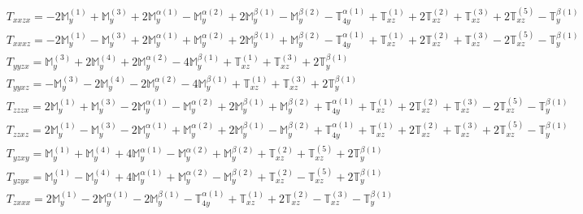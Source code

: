 \documentclass[fleqn,8pt,landscape]{jsarticle}
\begin{document}
\begin{align*}
& T_{xxzx} = - 2 \mathbb{M}_{y}^{(1)} + \mathbb{M}_{y}^{(3)} + 2 \mathbb{M}_{y}^{\alpha(1)} - \mathbb{M}_{y}^{\alpha(2)} + 2 \mathbb{M}_{y}^{\beta(1)} - \mathbb{M}_{y}^{\beta(2)} - \mathbb{T}_{4y}^{\alpha(1)} + \mathbb{T}_{xz}^{(1)} + 2 \mathbb{T}_{xz}^{(2)} + \mathbb{T}_{xz}^{(3)} + 2 \mathbb{T}_{xz}^{(5)} - \mathbb{T}_{y}^{\beta(1)} \\
& T_{xxxz} = - 2 \mathbb{M}_{y}^{(1)} - \mathbb{M}_{y}^{(3)} + 2 \mathbb{M}_{y}^{\alpha(1)} + \mathbb{M}_{y}^{\alpha(2)} + 2 \mathbb{M}_{y}^{\beta(1)} + \mathbb{M}_{y}^{\beta(2)} - \mathbb{T}_{4y}^{\alpha(1)} + \mathbb{T}_{xz}^{(1)} + 2 \mathbb{T}_{xz}^{(2)} + \mathbb{T}_{xz}^{(3)} - 2 \mathbb{T}_{xz}^{(5)} - \mathbb{T}_{y}^{\beta(1)} \\
& T_{yyzx} = \mathbb{M}_{y}^{(3)} + 2 \mathbb{M}_{y}^{(4)} + 2 \mathbb{M}_{y}^{\alpha(2)} - 4 \mathbb{M}_{y}^{\beta(1)} + \mathbb{T}_{xz}^{(1)} + \mathbb{T}_{xz}^{(3)} + 2 \mathbb{T}_{y}^{\beta(1)} \\
& T_{yyxz} = - \mathbb{M}_{y}^{(3)} - 2 \mathbb{M}_{y}^{(4)} - 2 \mathbb{M}_{y}^{\alpha(2)} - 4 \mathbb{M}_{y}^{\beta(1)} + \mathbb{T}_{xz}^{(1)} + \mathbb{T}_{xz}^{(3)} + 2 \mathbb{T}_{y}^{\beta(1)} \\
& T_{zzzx} = 2 \mathbb{M}_{y}^{(1)} + \mathbb{M}_{y}^{(3)} - 2 \mathbb{M}_{y}^{\alpha(1)} - \mathbb{M}_{y}^{\alpha(2)} + 2 \mathbb{M}_{y}^{\beta(1)} + \mathbb{M}_{y}^{\beta(2)} + \mathbb{T}_{4y}^{\alpha(1)} + \mathbb{T}_{xz}^{(1)} + 2 \mathbb{T}_{xz}^{(2)} + \mathbb{T}_{xz}^{(3)} - 2 \mathbb{T}_{xz}^{(5)} - \mathbb{T}_{y}^{\beta(1)} \\
& T_{zzxz} = 2 \mathbb{M}_{y}^{(1)} - \mathbb{M}_{y}^{(3)} - 2 \mathbb{M}_{y}^{\alpha(1)} + \mathbb{M}_{y}^{\alpha(2)} + 2 \mathbb{M}_{y}^{\beta(1)} - \mathbb{M}_{y}^{\beta(2)} + \mathbb{T}_{4y}^{\alpha(1)} + \mathbb{T}_{xz}^{(1)} + 2 \mathbb{T}_{xz}^{(2)} + \mathbb{T}_{xz}^{(3)} + 2 \mathbb{T}_{xz}^{(5)} - \mathbb{T}_{y}^{\beta(1)} \\
& T_{yzxy} = \mathbb{M}_{y}^{(1)} + \mathbb{M}_{y}^{(4)} + 4 \mathbb{M}_{y}^{\alpha(1)} - \mathbb{M}_{y}^{\alpha(2)} + \mathbb{M}_{y}^{\beta(2)} + \mathbb{T}_{xz}^{(2)} + \mathbb{T}_{xz}^{(5)} + 2 \mathbb{T}_{y}^{\beta(1)} \\
& T_{yzyx} = \mathbb{M}_{y}^{(1)} - \mathbb{M}_{y}^{(4)} + 4 \mathbb{M}_{y}^{\alpha(1)} + \mathbb{M}_{y}^{\alpha(2)} - \mathbb{M}_{y}^{\beta(2)} + \mathbb{T}_{xz}^{(2)} - \mathbb{T}_{xz}^{(5)} + 2 \mathbb{T}_{y}^{\beta(1)} \\
& T_{zxxx} = 2 \mathbb{M}_{y}^{(1)} - 2 \mathbb{M}_{y}^{\alpha(1)} - 2 \mathbb{M}_{y}^{\beta(1)} - \mathbb{T}_{4y}^{\alpha(1)} + \mathbb{T}_{xz}^{(1)} + 2 \mathbb{T}_{xz}^{(2)} - \mathbb{T}_{xz}^{(3)} - \mathbb{T}_{y}^{\beta(1)} \\

\end{align*}
\end{document}
